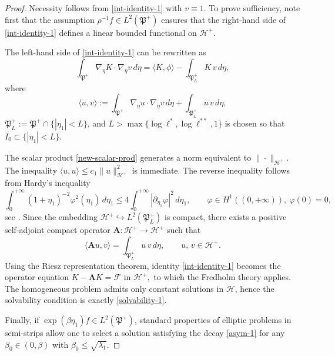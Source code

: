 \documentclass[reqno]{amsart}            %
\numberwithin{equation}{section}
\begin{document}
	\begin{proof}
		Necessity follows from \eqref{int-identity-1} with $v \equiv1$.  
		To prove sufficiency, note first that the assumption $\rho^{-1} f \in L^2(\mathfrak{P}^+)$ ensures that the right-hand side of \eqref{int-identity-1} defines a linear bounded functional on $\mathcal{H}^+$.
		
		The left-hand side of \eqref{int-identity-1} can be rewritten as
		\[
		\int_{\mathfrak{P}^+} \nabla_\eta K \cdot \nabla_\eta v \, d\eta
		= \langle K, \phi \rangle - \int_{\mathfrak{P}^+_L} K\, v \, d\eta,
		\]
		where
		\begin{equation}\label{new-scalar-prod}
			\langle u, v  \rangle :=
			\int_{\mathfrak{P}^+} \nabla_\eta u \cdot \nabla_\eta v \, d\eta
			+ \int_{\mathfrak{P}^+_L} u \, v \, d\eta,
		\end{equation}
		$\mathfrak{P}^+_L := \mathfrak{P}^+ \cap \{|\eta_1|<L\}$, and $L > \max\{\log\ell^*, \log\ell^{**}, 1\}$ is chosen so that $I_0 \subset \{|\eta_1|<L\}$.
		
		The scalar product \eqref{new-scalar-prod} generates a norm equivalent to $\|\cdot\|_{\mathcal{H}^+}$.  
		The inequality $\langle u, u \rangle \le c_1 \|u\|_{\mathcal{H}^+}^2$ is immediate.  
		The reverse inequality follows from Hardy’s inequality
		\begin{equation}\label{Hardy}
			\int_0^{+\infty} (1+\eta_1)^{-2} \varphi^2(\eta_1)\, d\eta_1
			\le 4 \int_0^{+\infty} |\partial_{\eta_1}\varphi|^2\, d\eta_1,
			\qquad \varphi \in H^1((0,+\infty)),\ \varphi(0)=0,
		\end{equation}
		see \cite[Lemma 4.1]{Mel-ZAA-1999}.
		Since the embedding $\mathcal{H}^+ \hookrightarrow L^2(\mathfrak{P}^+_L)$ is compact, there exists a positive self-adjoint compact operator $\mathbf{A} : \mathcal{H}^+ \to \mathcal{H}^+$ such that
		\[
		\langle \mathbf{A} u, v \rangle
		= \int_{\mathfrak{P}^+_L} u\, v\, d\eta,
		\qquad u,\, v  \in \mathcal{H}^+.
		\]
		Using the Riesz representation theorem, identity \eqref{int-identity-1} becomes the operator equation
		$K - \mathbf{A}K = \mathcal{F} $ in $\mathcal{H}^+,$
		to which the Fredholm theory applies. The homogeneous problem admits only constant solutions in $\mathcal{H}$, hence the solvability condition is exactly \eqref{solvability-1}.
		
		Finally, if $\exp(\beta \eta_1) f \in L^2(\mathfrak{P}^+)$, standard properties of elliptic problems in semi-strips allow one to select a solution satisfying the decay \eqref{asym-1} for any $\beta_0 \in (0,\beta)$ with $\beta_0 \le \sqrt{\lambda_1}$.
	\end{proof}
	
\end{document}
